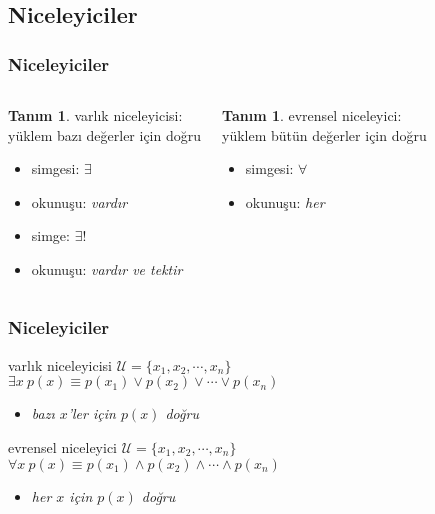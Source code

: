 \documentclass[dvipsnames]{beamer}
\theoremstyle{definition}
\newtheorem{tanim}[theorem]{Tanım}
\theoremstyle{example}
\theoremstyle{plain}
\begin{document}
\subsection{Niceleyiciler}

\begin{frame}
  \frametitle{Niceleyiciler}

  \begin{columns}[t]
    \begin{tanim}
      \alert{varlık niceleyicisi}:\\
        yüklem bazı değerler için doğru

      \begin{itemize}
        \item simgesi: $\exists$
        \item okunuşu: \emph{vardır}

        \pause
        \medskip
        \item simge: $\exists!$
        \item okunuşu: \emph{vardır ve tektir}
      \end{itemize}
    \end{tanim}

    \pause
    \begin{tanim}
      \alert{evrensel niceleyici}:\\
        yüklem bütün değerler için doğru

      \begin{itemize}
        \item simgesi: $\forall$
        \item okunuşu: \emph{her}
      \end{itemize}
    \end{tanim}
  \end{columns}
\end{frame}

\begin{frame}
  \frametitle{Niceleyiciler}

  \begin{block}{varlık niceleyicisi}
    $\mathcal{U} = \{x_1,x_2,\cdots,x_n\}$\\
    $\exists x~p(x) \equiv p(x_1) \vee p(x_2) \vee \cdots \vee p(x_n)$

    \begin{itemize}
      \item \emph{bazı $x$'ler için $p(x)$ doğru}
    \end{itemize}
  \end{block}

  \pause
  \begin{block}{evrensel niceleyici}
    $\mathcal{U} = \{x_1,x_2,\cdots,x_n\}$\\
    $\forall x~p(x) \equiv p(x_1) \wedge p(x_2) \wedge \cdots \wedge p(x_n)$

    \begin{itemize}
      \item \emph{her $x$ için $p(x)$ doğru}
    \end{itemize}
  \end{block}
\end{frame}
\end{document}
